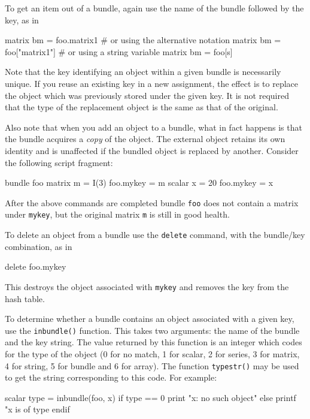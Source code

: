 To get an item out of a bundle, again use the name of the bundle
followed by the key, as in

\begin{code}
matrix bm = foo.matrix1
# or using the alternative notation
matrix bm = foo["matrix1"]
# or using a string variable
matrix bm = foo[s]
\end{code}

Note that the key identifying an object within a given bundle is
necessarily unique. If you reuse an existing key in a new assignment,
the effect is to replace the object which was previously stored under
the given key. It is not required that the type of the replacement
object is the same as that of the original.

Also note that when you add an object to a bundle, what in fact
happens is that the bundle acquires a \textit{copy} of the object. The
external object retains its own identity and is unaffected if the
bundled object is replaced by another. Consider the following script
fragment:

\begin{code}
bundle foo
matrix m = I(3)
foo.mykey = m
scalar x = 20
foo.mykey = x
\end{code}

After the above commands are completed bundle \texttt{foo} does not
contain a matrix under \texttt{mykey}, but the original matrix
\texttt{m} is still in good health.

To delete an object from a bundle use the \texttt{delete} command,
with the bundle/key combination, as in

\begin{code}
delete foo.mykey
\end{code}

This destroys the object associated with \texttt{mykey} and removes
the key from the hash table.

To determine whether a bundle contains an object associated with a
given key, use the \texttt{inbundle()} function. This takes two
arguments: the name of the bundle and the key string. The value
returned by this function is an integer which codes for the type of
the object (0 for no match, 1 for scalar, 2 for series, 3 for matrix,
4 for string, 5 for bundle and 6 for array). The function
\texttt{typestr()} may be used to get the string corresponding to this
code. For example:

\begin{code}
scalar type = inbundle(foo, x)
if type == 0
  print "x: no such object"
else
  printf "x is of type %
endif
\end{code}

